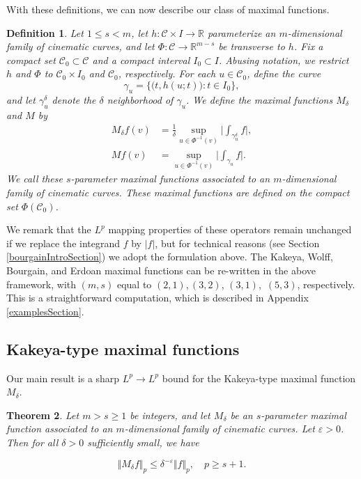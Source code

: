 \documentclass[letterpaper, reqno,11pt]{article}
\numberwithin{equation}{section}
\newcommand{\RR}{\mathbb{R}}
\newcommand{\eps}{\varepsilon}
\newtheorem{thm}{Theorem}
\numberwithin{thm}{section}
\newtheorem{defn}[thm]{Definition}
\theoremstyle{remark}
\begin{document}
%
With these definitions, we can now describe our class of maximal functions. 

\begin{defn}\label{defnClassOfMaximalOperators}
Let $1\leq s<m$, let $h\colon \mathcal{C}\times I \to\RR$ parameterize an $m$-dimensional family of cinematic curves, and let $\Phi\colon \mathcal{C} \to\RR^{m-s}$ be transverse to $h$. Fix a compact set $\mathcal{C}_0\subset \mathcal{C}$ and a compact interval $I_0\subset I$. Abusing notation, we restrict $h$ and $\Phi$ to $\mathcal{C}_0\times I_0$ and $\mathcal{C}_0$, respectively. For each $u\in\mathcal{C}_0$, define the curve
\[
\gamma_u = \big\{\big(t, h(u;t)\big)\colon t\in I_0\big\},
\] 
and let $\gamma_u^\delta$ denote the $\delta$ neighborhood of $\gamma_u$. We define the maximal functions $M_\delta$ and $M$ by 
\begin{align}
M_\delta f(v) & = \frac{1}{\delta} \sup_{u \in \Phi^{-1}(v)}\Big| \int_{\gamma_u^\delta} f\Big|,\label{defnMaximalFnDelta}\\
Mf(v) & =  \sup_{u \in \Phi^{-1}(v)}\Big|\int_{\gamma_u} f\Big|.\label{defnMaximalFnNoDelta}
\end{align}
%
We call these  \emph{$s$-parameter maximal functions associated to an $m$-dimensional family of cinematic curves}. These maximal functions are defined on the compact set $\Phi(\mathcal{C}_0)$.
\end{defn}

We remark that the $L^p$ mapping properties of these operators remain unchanged if we replace the integrand $f$ by $|f|$, but for technical reasons (see Section \ref{bourgainIntroSection}) we adopt the formulation above. The Kakeya, Wolff, Bourgain, and Erdoan maximal functions can be re-written in the above framework, with $(m,s)$ equal to $(2,1), (3,2)$, $(3,1),$ $(5,3)$, respectively. This is a straightforward computation, which is described in Appendix \ref{examplesSection}.
%
%

\subsection{Kakeya-type maximal functions}
Our main result is a sharp $L^p\to L^p$ bound for the Kakeya-type maximal function $M_\delta$.

\begin{thm}\label{mainThmMaximalKakeya}
Let $m>s\geq 1$ be integers, and let $M_\delta$ be an $s$-parameter maximal function associated to an $m$-dimensional family of cinematic curves. Let $\eps>0$. Then for all $\delta>0$ sufficiently small, we have

\begin{equation}\label{maximalFnBdMDelta}
\Vert M_\delta f\Vert_p \leq \delta^{-\eps}\Vert f\Vert_p,\quad p\geq s+1. 
\end{equation}
\end{thm}
\end{document}
